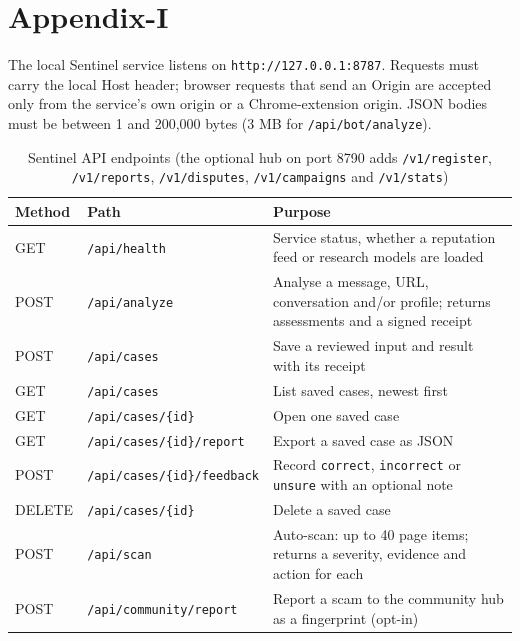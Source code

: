 \newpage
\chapter*{Appendix-I}
\onehalfspacing
\pagestyle{fancy}
\fancyhf{}
\renewcommand{\headrulewidth}{0pt}
\cfoot{\thepage}
\renewcommand{\thetable}{A.\arabic{table}}\setcounter{table}{0}
\noindent The local Sentinel service listens on \texttt{http://127.0.0.1:8787}. Requests must carry the local Host header; browser requests that send an Origin are accepted only from the service's own origin or a Chrome-extension origin. JSON bodies must be between 1 and 200,000 bytes (3 MB for \texttt{/api/bot/analyze}).

\begin{table}[H]
\centering
\small
\renewcommand{\arraystretch}{1.2}
\caption{Sentinel API endpoints (the optional hub on port 8790 adds \texttt{/v1/register}, \texttt{/v1/reports}, \texttt{/v1/disputes}, \texttt{/v1/campaigns} and \texttt{/v1/stats})}
\label{tab:api}
\begin{tabular}{|l|l|>{\raggedright\arraybackslash}p{8.6cm}|}
\hline
\textbf{Method} & \textbf{Path} & \textbf{Purpose} \\ \hline
GET & \texttt{/api/health} & Service status, whether a reputation feed or research models are loaded \\ \hline
POST & \texttt{/api/analyze} & Analyse a message, URL, conversation and/or profile; returns assessments and a signed receipt \\ \hline
POST & \texttt{/api/cases} & Save a reviewed input and result with its receipt \\ \hline
GET & \texttt{/api/cases} & List saved cases, newest first \\ \hline
GET & \texttt{/api/cases/\{id\}} & Open one saved case \\ \hline
GET & \texttt{/api/cases/\{id\}/report} & Export a saved case as JSON \\ \hline
POST & \texttt{/api/cases/\{id\}/feedback} & Record \texttt{correct}, \texttt{incorrect} or \texttt{unsure} with an optional note \\ \hline
DELETE & \texttt{/api/cases/\{id\}} & Delete a saved case \\ \hline
POST & \texttt{/api/scan} & Auto-scan: up to 40 page items; returns a severity, evidence and action for each \\ \hline
POST & \texttt{/api/community/report} & Report a scam to the community hub as a fingerprint (opt-in) \\ \hline

\end{tabular}
\end{table}
